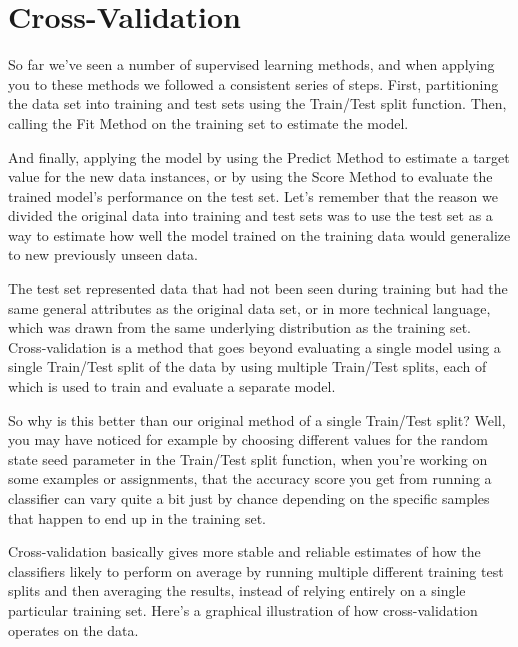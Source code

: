 \section{Cross-Validation}
\begin{multicols}{2}

So far we've seen a number of supervised learning methods, and when applying you to these methods we followed a consistent series of steps. First, partitioning the data set into training and test sets using the Train/Test split function. Then, calling the Fit Method on the training set to estimate the model. 

And finally, applying the model by using the Predict Method to estimate a target value for the new data instances, or by using the Score Method to evaluate the trained model's performance on the test set. Let's remember that the reason we divided the original data into training and test sets was to use the test set as a way to estimate how well the model trained on the training data would generalize to new previously unseen data. 

The test set represented data that had not been seen during training but had the same general attributes as the original data set, or in more technical language, which was drawn from the same underlying distribution as the training set. Cross-validation is a method that goes beyond evaluating a single model using a single Train/Test split of the data by using multiple Train/Test splits, each of which is used to train and evaluate a separate model. 

So why is this better than our original method of a single Train/Test split? Well, you may have noticed for example by choosing different values for the random state seed parameter in the Train/Test split function, when you're working on some examples or assignments, that the accuracy score you get from running a classifier can vary quite a bit just by chance depending on the specific samples that happen to end up in the training set. 

Cross-validation basically gives more stable and reliable estimates of how the classifiers likely to perform on average by running multiple different training test splits and then averaging the results, instead of relying entirely on a single particular training set. Here's a graphical illustration of how cross-validation operates on the data. 


\end{multicols}
